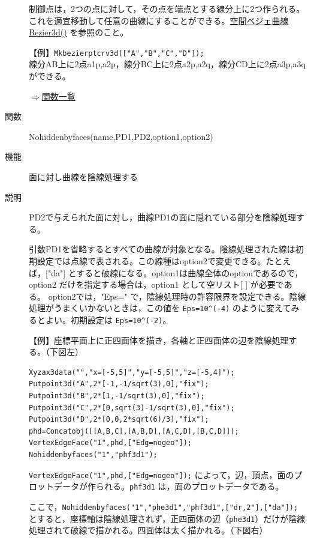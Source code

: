 \documentclass[papersize,a4paper,12pt,uplatex]{jsarticle}
\begin{document}
\begin{description}
  制御点は，2つの点に対して，その点を端点とする線分上に2つ作られる。これを適宜移動して任意の曲線にすることができる。\hyperlink{bezier3d}{空間ベジェ曲線 Bezier3d()} を参照のこと。
  
\vspace{\baselineskip}
【例】\verb|Mkbezierptcrv3d(["A","B","C","D"]);|\\
    線分AB上に2点a1p,a2p，線分BC上に2点a2p,a2q，線分CD上に2点a3p,a3qができる。
    

\begin{flushright} \hyperlink{functionlist}{$\Rightarrow$関数一覧}\end{flushright}

\hypertarget{nohiddenbyfaces}{}
\item[関数]  Nohiddenbyfaces(name,PD1,PD2,option1,option2)
\item[機能]  面に対し曲線を陰線処理する
\item[説明]  PD2で与えられた面に対し，曲線PD1の面に隠れている部分を陰線処理する。

引数PD1を省略するとすべての曲線が対象となる。陰線処理された線は初期設定では点線で表される。この線種はoption2で変更できる。たとえば，["da"] とすると破線になる。option1は曲線全体のoptionであるので，option2 だけを指定する場合は，option1 として空リスト[ ] が必要である。
option2では，"Eps=" で，陰線処理時の許容限界を設定できる。陰線処理がうまくいかないときは，この値を \verb|Eps=10^(-4)| のように変えてみるとよい。初期設定は \verb|Eps=10^(-2)|。

\vspace{\baselineskip}
【例】座標平面上に正四面体を描き，各軸と正四面体の辺を陰線処理する。（下図左）
\begin{verbatim}
Xyzax3data("","x=[-5,5]","y=[-5,5]","z=[-5,4]");
Putpoint3d("A",2*[-1,-1/sqrt(3),0],"fix");
Putpoint3d("B",2*[1,-1/sqrt(3),0],"fix");
Putpoint3d("C",2*[0,sqrt(3)-1/sqrt(3),0],"fix");
Putpoint3d("D",2*[0,0,2*sqrt(6)/3],"fix");
phd=Concatobj([[A,B,C],[A,B,D],[A,C,D],[B,C,D]]);
VertexEdgeFace("1",phd,["Edg=nogeo"]);
Nohiddenbyfaces("1","phf3d1"); 
\end{verbatim}

  \verb|VertexEdgeFace("1",phd,["Edg=nogeo"]);| によって，辺，頂点，面のプロットデータが作られる。\verb|phf3d1| は，面のプロットデータである。
  
ここで，\verb|Nohiddenbyfaces("1","phe3d1","phf3d1",["dr,2"],["da"]); | とすると，座標軸は陰線処理されず，正四面体の辺（\verb|phe3d1|）だけが陰線処理されて破線で描かれる。四面体は太く描かれる。（下図右）
  

\end{description}
\end{document}
